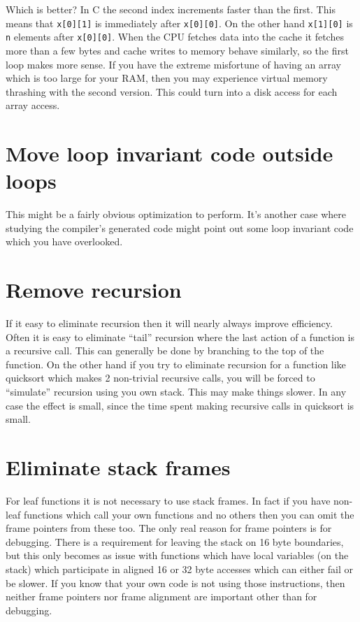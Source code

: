 \documentclass[11pt,b5paper]{book}
\begin{document}
Which is better?  In C the second index increments faster than the first.
This means that {\tt x[0][1]} is immediately after {\tt x[0][0]}.
On the other hand {\tt x[1][0]} is {\tt n} elements after {\tt x[0][0]}.
When the CPU fetches data into the cache it fetches more than a few bytes and
cache writes to memory behave similarly, so the first loop makes more sense.
If you have the extreme misfortune of having an array which is too large for
your RAM, then you may experience virtual memory thrashing with the second
version.
This could turn into a disk access for each array access.

\section{Move loop invariant code outside loops}

This might be a fairly obvious optimization to perform.
It's another case where studying the compiler's generated code might
point out some loop invariant code which you have overlooked.

\section{Remove recursion}

If it easy to eliminate recursion then it will nearly always improve efficiency.
Often it is easy to eliminate ``tail'' recursion where the last action of a function is a recursive call.
This can generally be done by branching to the top of the function.
On the other hand if you try to eliminate recursion for a function like quicksort
which makes 2 non-trivial recursive calls, you will be forced to ``simulate'' recursion using you own stack.
This may make things slower.
In any case the effect is small, since the time spent making recursive calls
in quicksort is small.

\section{Eliminate stack frames}

For leaf functions it is not necessary to use stack frames.
In fact if you have non-leaf functions which call your own functions and no
others then you can omit the frame pointers from these too.
The only real reason for frame pointers is for debugging.
There is a requirement for leaving the stack on 16 byte boundaries, but this
only becomes as issue with functions which have local variables (on the stack)
which participate in aligned 16 or 32 byte accesses which can either fail or
be slower.
If you know that your own code is not using those instructions, then neither
frame pointers nor frame alignment are important other than for debugging.
\end{document}
